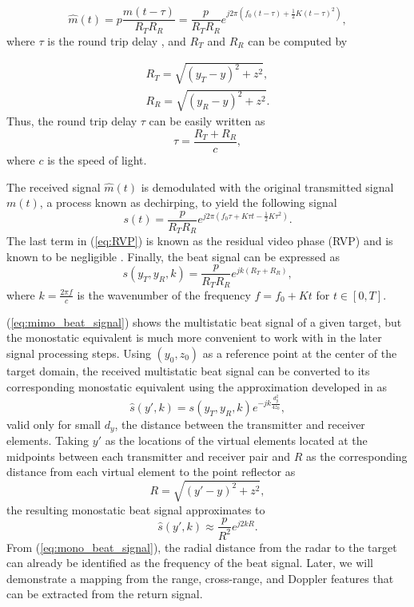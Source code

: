 \documentclass[10pt,journal,final]{IEEEtran}
\begin{document}
\begin{equation}
	\hat{m}(t) = p \frac{m(t-\tau)}{R_T R_R} = \frac{p}{R_T R_R} e^{j2\pi( f_0(t-\tau) + \frac{1}{2}K(t-\tau)^2)},
\end{equation}
where $\tau$ is the round trip delay \cite{fmcw:signal_model_3D_near_field_MIMO_Range_Migration}, and $R_T$ and $R_R$ can be computed by

\begin{gather}
	R_T = \sqrt{(y_T - y)^2 + z^2}, \\
	R_R = \sqrt{(y_R - y)^2 + z^2}.
\end{gather}
Thus, the round trip delay $\tau$ can be easily written as 
\begin{equation}
	\tau = \frac{R_T + R_R}{c},
\end{equation}
where $c$ is the speed of light. 

The received signal $\hat{m}(t)$ is demodulated with the original transmitted signal $m(t)$, a process known as dechirping, to yield the following signal
\begin{equation}
	\label{eq:RVP}
	s(t) = \frac{p}{R_T R_R} e^{j2\pi(f_0\tau + K\tau t- \frac{1}{2}K\tau^2)}.
\end{equation}
The last term in (\ref{eq:RVP}) is known as the residual video phase (RVP) and is known to be negligible \cite{muhammet:sparse}. Finally, the beat signal can be expressed as
\begin{equation}
\label{eq:mimo_beat_signal}
	s(y_T,y_R,k) = \frac{p}{R_T R_R} e^{jk(R_T + R_R)},
\end{equation}
where $k = \frac{2\pi f}{c}$ is the wavenumber of the frequency $f = f_0 + Kt$ for $t \in [0,T]$. 

(\ref{eq:mimo_beat_signal}) shows the multistatic beat signal of a given target, but the monostatic equivalent is much more convenient to work with in the later signal processing steps. Using $(y_0,z_0)$ as a reference point at the center of the target domain, the received multistatic beat signal can be converted to its corresponding monostatic equivalent using the approximation developed in \cite{muhammet:testbeds} as
\begin{equation}
\label{eq:mult-to-mono}
	\hat{s}(y',k) = s(y_T,y_R,k) e^{-jk\frac{d_y^2}{4z_0}},
\end{equation}
valid only for small $d_y$, the distance between the transmitter and receiver elements. Taking $y'$ as the locations of the virtual elements located at the midpoints between each transmitter and receiver pair and $R$ as the corresponding distance from each virtual element to the point reflector as
\begin{equation}
	R = \sqrt{(y' - y)^2 + z^2},
\end{equation}
the resulting monostatic beat signal approximates to
\begin{equation}
\label{eq:mono_beat_signal}
	\hat{s}(y',k) \approx \frac{p}{R^2}e^{j2kR}.
\end{equation}
From (\ref{eq:mono_beat_signal}), the radial distance from the radar to the target can already be identified as the frequency of the beat signal. Later, we will demonstrate a mapping from the range, cross-range, and Doppler features that can be extracted from the return signal.
\end{document}
